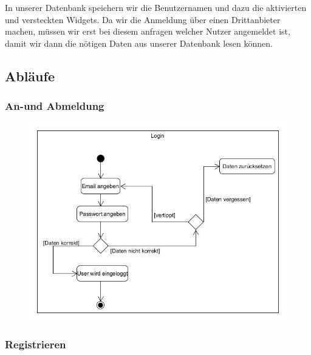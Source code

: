 	In unserer Datenbank speichern wir die Benutzernamen und dazu die aktivierten und versteckten Widgets.
	Da wir die Anmeldung über einen Drittanbieter machen, müssen wir erst bei diesem anfragen welcher Nutzer
	angemeldet ist, damit wir dann die nötigen Daten aus unserer Datenbank lesen können.
	
	\label{ablauf}
	\subsection{Abläufe}
	
		\subsubsection{An-und Abmeldung}
		
			\begin{figure}[H]
				\includegraphics[scale=0.6]{images/UC1Activity}
			\end{figure}
		
		\subsubsection{Registrieren}
		
